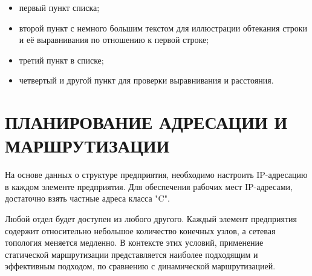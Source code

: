\documentclass[14pt, a4paper]{extarticle}
\begin{document}
\begin{itemize}
    \item первый пункт списка;
    \item второй пункт с немного большим текстом для иллюстрации обтекания строки и её выравнивания по отношению к первой строке;
    \item третий пункт в списке;
    \item четвертый и другой пункт для проверки выравнивания и расстояния.
\end{itemize}

\section[ПЛАНИРОВАНИЕ АДРЕСАЦИИ И МАРШРУТИЗАЦИИ]{ПЛАНИРОВАНИЕ АДРЕСАЦИИ И \\ МАРШРУТИЗАЦИИ}
На основе данных о структуре предприятия,
необходимо настроить IP-адресацию в каждом элементе
предприятия. Для обеспечения рабочих мест IP-адресами, достаточно взять частные адреса класса "C".


Любой отдел будет доступен из любого другого.
Каждый элемент предприятия содержит относительно небольшое количество конечных узлов, 
а сетевая топология меняется медленно. В контексте этих условий, применение 
статической маршрутизации представляется наиболее подходящим и эффективным подходом, 
по сравнению с динамической маршрутизацией.\cite{habr-routing}
\end{document}
